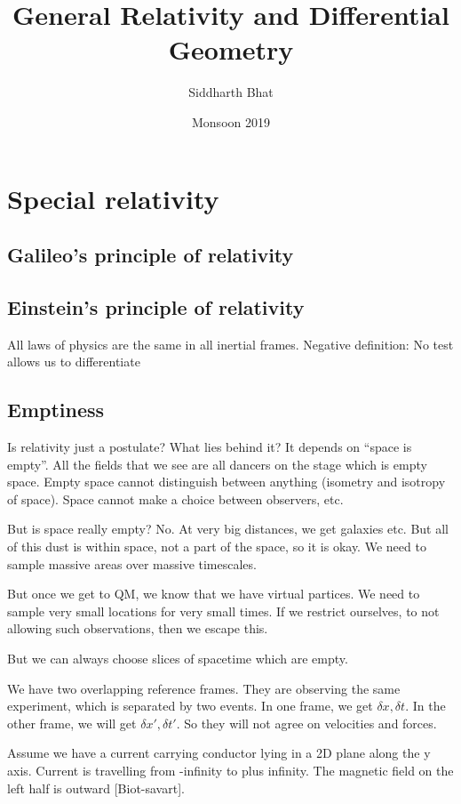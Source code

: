 \documentclass[11pt]{book}
\title{General Relativity and Differential Geometry}
\author{Siddharth Bhat}
\date{Monsoon 2019}
\begin{document}
\maketitle
\tableofcontents

\chapter{Special relativity}

\section{Galileo's principle of relativity}
\section{Einstein's principle of relativity}
All laws of physics are the same in all inertial frames.
Negative definition: No test allows us to differentiate
\section{Emptiness}
Is relativity just a postulate? What lies behind it? It depends on
``space is empty''. All the fields that we see are all dancers on the
stage which is empty space. Empty space cannot distinguish between anything
(isometry and isotropy of space). Space cannot make a choice between observers,
etc.

But is space really empty? No. At very big distances, we get galaxies etc. But
all of this dust is within space, not a part of the space, so it is okay. We need
to sample massive areas over massive timescales.

But once we get to QM, we know that we have virtual partices. We need to sample
very small locations for very small times. If we restrict ourselves, to not
allowing such observations, then we escape this.

But we can always choose slices of spacetime which are empty.

We have two overlapping reference frames. They are observing the same experiment,
which is separated by two events. In one frame, we get $\delta x, \delta t$. In
the other frame, we will get $\delta x', \delta t'$. So they will not
agree on velocities and forces. 

Assume we have a current carrying conductor lying in a 2D plane along the y axis.
Current is travelling from -infinity to plus infinity. The magnetic field on the
left half is outward [Biot-savart].
\end{document}
